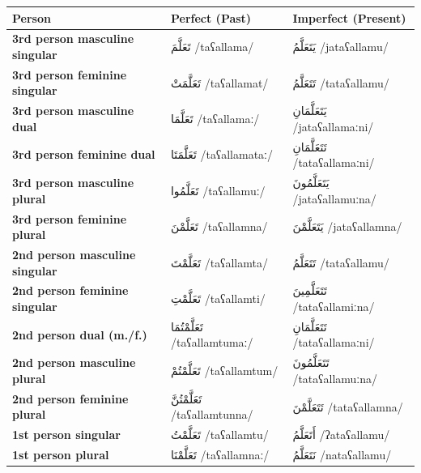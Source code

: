 \documentclass[letterpaper,12pt]{article}
\begin{document}
\begin{longtable}{|>{\raggedright}p{3.5cm}|p{5cm}|p{5cm}|}
\hline
\textbf{Person} & \textbf{Perfect (Past)} & \textbf{Imperfect (Present)} \\
\hline
\textbf{3rd person masculine singular} & \textarabic{تَعَلَّمَ} /taʕallama/ & \textarabic{يَتَعَلَّمُ} /jataʕallamu/ \\
\hline
\textbf{3rd person feminine singular} & \textarabic{تَعَلَّمَتْ} /taʕallamat/ & \textarabic{تَتَعَلَّمُ} /tataʕallamu/ \\
\hline
\textbf{3rd person masculine dual} & \textarabic{تَعَلَّمَا} /taʕallamaː/ & \textarabic{يَتَعَلَّمَانِ} /jataʕallamaːni/ \\
\hline
\textbf{3rd person feminine dual} & \textarabic{تَعَلَّمَتَا} /taʕallamataː/ & \textarabic{تَتَعَلَّمَانِ} /tataʕallamaːni/ \\
\hline
\textbf{3rd person masculine plural} & \textarabic{تَعَلَّمُوا} /taʕallamuː/ & \textarabic{يَتَعَلَّمُونَ} /jataʕallamuːna/ \\
\hline
\textbf{3rd person feminine plural} & \textarabic{تَعَلَّمْنَ} /taʕallamna/ & \textarabic{يَتَعَلَّمْنَ} /jataʕallamna/ \\
\hline
\textbf{2nd person masculine singular} & \textarabic{تَعَلَّمْتَ} /taʕallamta/ & \textarabic{تَتَعَلَّمُ} /tataʕallamu/ \\
\hline
\textbf{2nd person feminine singular} & \textarabic{تَعَلَّمْتِ} /taʕallamti/ & \textarabic{تَتَعَلَّمِينَ} /tataʕallamiːna/ \\
\hline
\textbf{2nd person dual (m./f.)} & \textarabic{تَعَلَّمْتُمَا} /taʕallamtumaː/ & \textarabic{تَتَعَلَّمَانِ} /tataʕallamaːni/ \\
\hline
\textbf{2nd person masculine plural} & \textarabic{تَعَلَّمْتُمْ} /taʕallamtum/ & \textarabic{تَتَعَلَّمُونَ} /tataʕallamuːna/ \\
\hline
\textbf{2nd person feminine plural} & \textarabic{تَعَلَّمْتُنَّ} /taʕallamtunna/ & \textarabic{تَتَعَلَّمْنَ} /tataʕallamna/ \\
\hline
\textbf{1st person singular} & \textarabic{تَعَلَّمْتُ} /taʕallamtu/ & \textarabic{أَتَعَلَّمُ} /ʔataʕallamu/ \\
\hline
\textbf{1st person plural} & \textarabic{تَعَلَّمْنَا} /taʕallamnaː/ & \textarabic{نَتَعَلَّمُ} /nataʕallamu/ \\
\hline
\end{longtable}
\end{document}
